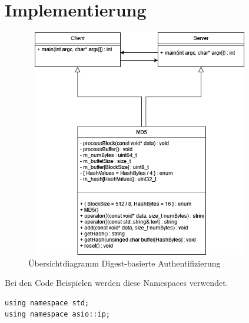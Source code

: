 \documentclass[12pt]{report}
\begin{document}
\chapter{Implementierung}
\begin{figure}[h]
 \centering
 \includegraphics[width=10cm,height=10cm]{DigestBasierteAuthUML.png}
 \caption{Übersichtdiagramm Digest-basierte Authentifizierung}
 \label{fig:Profil}
\end{figure}

Bei den Code Beispielen werden diese Namespaces verwendet.
\begin{verbatim}
using namespace std;
using namespace asio::ip;
\end{verbatim}
\end{document}
